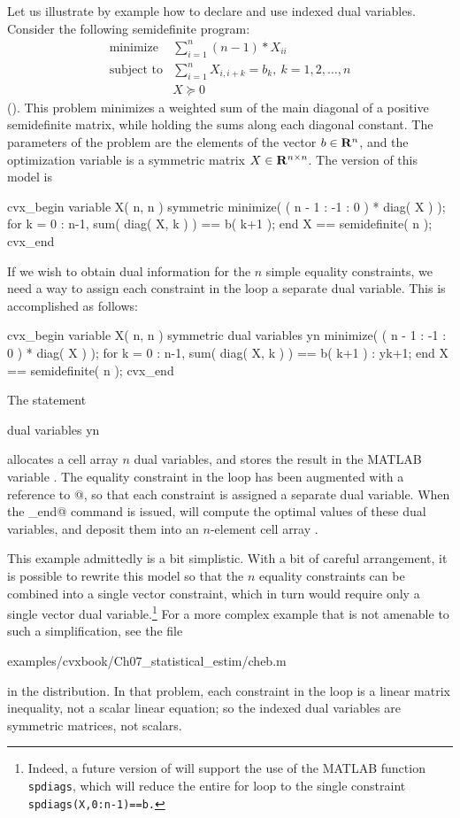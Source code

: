 \documentclass[12pt]{article}
\begin{document}
Let us illustrate by example how to declare and use indexed dual
variables. Consider the following semidefinite program:
\begin{equation}
	\begin{array}{rl}
		\text{minimize}   & \sum_{i=1}^n (n-1) * X_{ii} \\
		\text{subject to} & \sum_{i=1}^n X_{i,i+k} = b_k, ~ k = 1,2,\dots,n \\
				  & X \succeq 0
	\end{array}
\end{equation}
(\cite{Stu:99}). This problem minimizes a weighted sum of the main diagonal
of a positive semidefinite matrix, while holding the sums along each diagonal
constant. The parameters of the problem are
the elements of the vector $b\in\mathbf{R}^{n}$, and the optimization variable is a
symmetric matrix $X\in\mathbf{R}^{{n}\times{n}}$. The \cvx version of this model is
\begin{code}
	cvx_begin
	    variable X( n, n ) symmetric
	    minimize( ( n - 1 : -1 : 0 ) * diag( X ) );
	    for k = 0 : n-1,
	        sum( diag( X, k ) ) == b( k+1 );
	    end
	    X == semidefinite( n );
	cvx_end
\end{code}
If we wish to obtain dual information for the $n$ simple equality constraints,
we need a way to assign each constraint in the \verb@for@ loop a separate dual variable.
This is accomplished as follows:
\begin{code}
	cvx_begin
	    variable X( n, n ) symmetric
	    dual variables y{n}
	    minimize( ( n - 1 : -1 : 0 ) * diag( X ) );
	    for k = 0 : n-1,
	        sum( diag( X, k ) ) == b( k+1 ) : y{k+1};
	    end
	    X == semidefinite( n );
	cvx_end
\end{code}
The statement
\begin{code}
	dual variables y{n}
\end{code}
allocates a cell array $n$ dual variables, and stores the result in the MATLAB
variable \verb@Z@. The equality constraint in the \verb@for@ loop has been augmented
with a reference to @, so that each constraint is assigned a separate
dual variable.
When the \verb@cvx_end@ command is issued, \cvx will compute the optimal values
of these dual variables, and deposit them into an $n$-element cell array \verb@y@.

This example admittedly is a bit simplistic. With a bit of careful arrangement,
it is possible to rewrite this model so that the $n$ equality constraints can be
combined into a single vector constraint, which in turn would require only a single
vector dual variable.\footnote{Indeed, a future version of \cvx will support the
use of the MATLAB function \texttt{spdiags}, which will reduce the entire for loop
to the single constraint \texttt{spdiags(X,0:n-1)==b.}} For a more complex example
that is not amenable to such a simplification, see the file
\begin{code}
	examples/cvxbook/Ch07_statistical_estim/cheb.m
\end{code}
in the \cvx distribution.
In that problem, each constraint in the \verb@for@ loop is a linear matrix
inequality, not a scalar linear equation;
so the indexed dual variables are symmetric matrices, not scalars.
\end{document}
